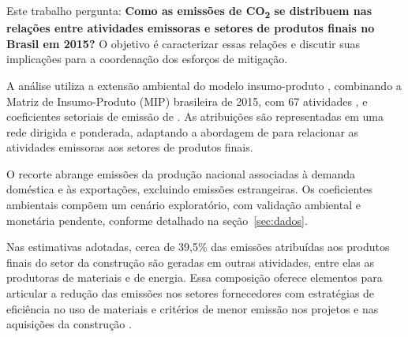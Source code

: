 Este trabalho pergunta: \textbf{Como as emissões de CO\textsubscript{2} se distribuem nas relações entre atividades emissoras e setores de produtos finais no Brasil em 2015?} O objetivo é caracterizar essas relações e discutir suas implicações para a coordenação dos esforços de mitigação.

A análise utiliza a extensão ambiental do modelo insumo-produto \parencite{millerBlair2009}, combinando a Matriz de Insumo-Produto (MIP) brasileira de 2015, com 67 atividades \parencite{ibge2015mip}, e coeficientes setoriais de emissão de \textcite{sanguinetAzzoni2024}. As atribuições são representadas em uma rede dirigida e ponderada, adaptando a abordagem de \textcite{huang2019} para relacionar as atividades emissoras aos setores de produtos finais.

O recorte abrange emissões da produção nacional associadas à demanda doméstica e às exportações, excluindo emissões estrangeiras. Os coeficientes ambientais compõem um cenário exploratório, com validação ambiental e monetária pendente, conforme detalhado na seção~\ref{sec:dados}.

Nas estimativas adotadas, cerca de 39,5\% das emissões atribuídas aos produtos finais do setor da construção são geradas em outras atividades, entre elas as produtoras de materiais e de energia. Essa composição oferece elementos para articular a redução das emissões nos setores fornecedores com estratégias de eficiência no uso de materiais e critérios de menor emissão nos projetos e nas aquisições da construção \parencite{rissman2020}.

